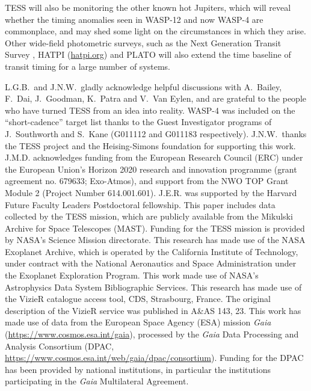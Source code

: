 \documentclass[12pt,twocolumn,tighten]{aastex62}
\begin{document}
TESS will also be monitoring the other known hot Jupiters, which will
reveal whether the timing anomalies seen in WASP-12 and now WASP-4 are
commonplace, and may shed some light on the circumstances in which
they arise. Other wide-field photometric surveys, such as the Next
Generation Transit Survey \citep{wheatley_next_2018}, HATPI
(\href{https://hatpi.org}{hatpi.org}) and
PLATO \citep{rauer_plato_2014} will also extend
the time baseline of transit timing for a large number of systems.

\acknowledgements
L.G.B.\ and J.N.W.\ gladly acknowledge helpful discussions with
A.~Bailey, F.~Dai, J.~Goodman, K.~Patra and V.~Van Eylen, and are
grateful to the people who have turned TESS from an idea into reality.
%
WASP-4 was included on the ``short-cadence'' target list thanks to the
Guest Investigator programs of J.\ Southworth and S.\ Kane (G011112
and G011183 respectively). 
%
J.N.W.\ thanks the TESS project and the Heising-Simons foundation for
supporting this work.
%
J.M.D. acknowledges funding from the European Research Council (ERC)
under the European Union's Horizon 2020 research and innovation
programme (grant agreement no. 679633; Exo-Atmos), and support from
the NWO TOP Grant Module 2 (Project Number 614.001.601).
%
J.E.R. was supported by the Harvard Future Faculty Leaders
Postdoctoral fellowship.
%
This paper includes data collected by the TESS mission, which are
publicly available from the Mikulski Archive for Space Telescopes
(MAST).
%
Funding for the TESS mission is provided by NASA's Science Mission
directorate.
%
This research has made use of the NASA Exoplanet Archive, which is
operated by the California Institute of Technology, under contract
with the National Aeronautics and Space Administration under the
Exoplanet Exploration Program.
%
This work made use of NASA's Astrophysics Data System Bibliographic
Services.
%
This research has made use of the VizieR catalogue access tool, CDS,
Strasbourg, France. The original description of the VizieR service was
published in A\&AS 143, 23.
%
This work has made use of data from the European Space Agency (ESA)
mission {\it Gaia} (\url{https://www.cosmos.esa.int/gaia}), processed
by the {\it Gaia} Data Processing and Analysis Consortium (DPAC,
\url{https://www.cosmos.esa.int/web/gaia/dpac/consortium}). Funding
for the DPAC has been provided by national institutions, in particular
the institutions participating in the {\it Gaia} Multilateral
Agreement.
%
\newline
%
%
\end{document}
